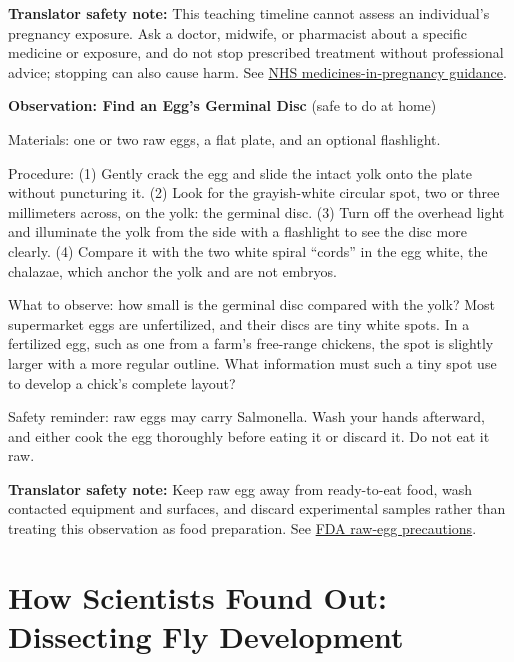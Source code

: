 \textbf{Translator safety note:} This teaching timeline cannot assess an individual's pregnancy exposure. Ask a doctor, midwife, or pharmacist about a specific medicine or exposure, and do not stop prescribed treatment without professional advice; stopping can also cause harm. See \href{https://www.nhs.uk/pregnancy/keeping-well/medicines/}{NHS medicines-in-pregnancy guidance}.

\begin{shiyan}
\textbf{Observation: Find an Egg's Germinal Disc} (safe to do at home)

Materials: one or two raw eggs, a flat plate, and an optional flashlight.

Procedure: (1) Gently crack the egg and slide the intact yolk onto the plate without puncturing it. (2) Look for the grayish-white circular spot, two or three millimeters across, on the yolk: the germinal disc. (3) Turn off the overhead light and illuminate the yolk from the side with a flashlight to see the disc more clearly. (4) Compare it with the two white spiral ``cords'' in the egg white, the chalazae, which anchor the yolk and are not embryos.

What to observe: how small is the germinal disc compared with the yolk? Most supermarket eggs are unfertilized, and their discs are tiny white spots. In a fertilized egg, such as one from a farm's free-range chickens, the spot is slightly larger with a more regular outline. What information must such a tiny spot use to develop a chick's complete layout?

Safety reminder: raw eggs may carry Salmonella. Wash your hands afterward, and either cook the egg thoroughly before eating it or discard it. Do not eat it raw.
\end{shiyan}

\textbf{Translator safety note:} Keep raw egg away from ready-to-eat food, wash contacted equipment and surfaces, and discard experimental samples rather than treating this observation as food preparation. See \href{https://www.fda.gov/food/retail-food-industryregulatory-assistance-training/assuring-safety-eggs-and-menu-and-deli-items-made-raw-shell-eggs}{FDA raw-egg precautions}.

\section{How Scientists Found Out: Dissecting Fly Development}

